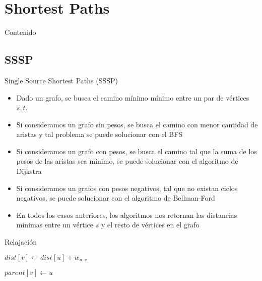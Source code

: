 \documentclass[handout]{beamer}
\begin{document}
\section{Shortest Paths}
\begin{frame}{Contenido}
\tableofcontents[currentsection]
\end{frame}

\subsection{SSSP}
\begin{frame}{Single Source Shortest Paths (SSSP)}
 \begin{itemize}
   \item Dado un grafo, se busca el camino m\'inimo m\'inimo entre un par de v\'ertices $s, t$.
      \pause
    \item Si consideramos un grafo sin pesos, se busca el camino con menor cantidad de aristas y tal problema se puede solucionar con el BFS
      \pause
    \item Si consideramos un grafo con pesos, se busca el camino tal que la suma de los pesos de las aristas sea m\'inimo, se puede solucionar con el algoritmo de Dijkstra
      \pause
    \item Si consideramos un grafos con pesos negativos, tal que no existan ciclos negativos, se puede solucionar con el algoritmo de Bellman-Ford
      \pause
    \item En todos los casos anteriores, los algoritmos nos retornan las distancias m\'inimas entre un v\'ertice $s$ y el resto de v\'ertices en el grafo
  \end{itemize}
\end{frame}

\begin{frame}{Relajaci\'on}
  \begin{algorithm}[H]
    \BlankLine
    {
      $dist[v] \leftarrow dist[u] + w_{u,v}$

      $parent[v] \leftarrow u $

    }
    \BlankLine
  \end{algorithm}
\end{frame}
\end{document}

